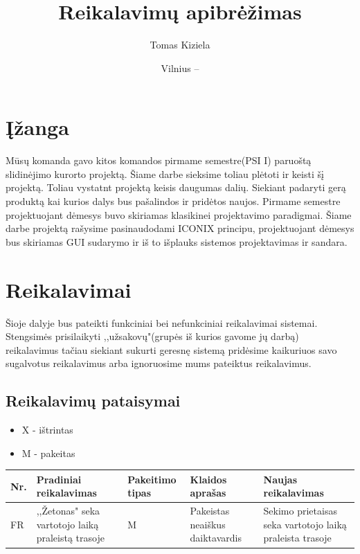 \documentclass[oneside]{VUMIFPSkursinis}
\title{Reikalavimų apibrėžimas}
\author{Tomas Kiziela}
\date{Vilnius – \the\year}
\begin{document}
\maketitle
\tableofcontents

\section{Įžanga}
Mūsų komanda gavo kitos komandos pirmame semestre(PSI I) paruoštą slidinėjimo kurorto projektą. Šiame darbe sieksime toliau plėtoti ir keisti šį projektą. Toliau vystatnt projektą keisis daugumas dalių. Siekiant padaryti gerą produktą kai kurios  dalys bus pašalindos ir pridėtos naujos. Pirmame semestre projektuojant dėmesys buvo skiriamas klasikinei projektavimo paradigmai. Šiame darbe projektą rašysime pasinaudodami ICONIX principu, projektuojant dėmesys bus skiriamas GUI sudarymo ir iš to išplauks sistemos projektavimas ir sandara. 

\section{Reikalavimai}
Šioje dalyje bus pateikti funkciniai bei nefunkciniai reikalavimai sistemai. Stengsimės prisilaikyti ,,užsakovų"(grupės iš kurios gavome jų darbą) reikalavimus tačiau siekiant sukurti geresnę sistemą pridėsime kaikuriuos savo sugalvotus reikalavimus arba ignoruosime mums pateiktus reikalavimus. 

\subsection{Reikalavimų pataisymai}
	\begin{itemize}
		\item{X - ištrintas}
		\item{M - pakeitas}
	\end{itemize}


\begin{table}[htbp]

\begin{tabularx}{1\textwidth}{  |P{1cm}|X|P{1.5cm}|p{3.5cm}|X| }  \hline
	Nr. & Pradiniai reikalavimas&  Pakeitimo tipas & Klaidos aprašas  & Naujas reikalavimas \\ \hline
	FR & ,,Žetonas" seka vartotojo laiką praleistą trasoje & M & Pakeistas neaiškus daiktavardis & Sekimo prietaisas seka vartotojo laiką praleista trasoje \\ \hline
	

	
	

\end{tabularx}

	
\end{table}
\end{document}
